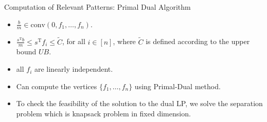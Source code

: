 \documentclass[xcolor=table]{beamer} %
\theoremstyle{definition}
\theoremstyle{plain}
\theoremstyle{remark}
\renewcommand{\b}[1]{\textcolor{dblue}{#1}}
\begin{document}
\begin{frame}{Computation of Relevant Patterns: Primal Dual Algorithm}

    \begin{itemize}
        \item $\frac{b}{m} \in \text{conv}(0, f_1, \ldots, f_n)$. 

        \item $\frac{s^\text{T} b}{m} \leq s^\text{T} f_i \leq \widetilde{C}$, for all $i \in [n]$, where $\widetilde{C}$ is defined according to the upper bound $UB$.
        
        \item all $f_i$ are linearly independent.
    \end{itemize}
    

        \begin{itemize}
            \item Can compute the vertices $\{f_1, \ldots, f_n\}$ using Primal-Dual method.
            
            \item To check the feasibility of the solution to the dual LP, we solve the separation problem which is knapsack problem in fixed dimension.
        \end{itemize}
\end{frame}



\end{document}
